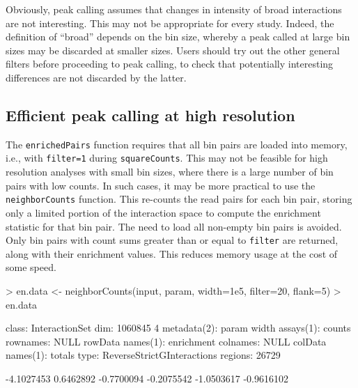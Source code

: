 \documentclass[12pt]{report}
\renewenvironment{Schunk}{\vspace{0pt}}{\vspace{0pt}}
\newcommand{\code}[1]{{\small\texttt{#1}}}
\begin{document}
Obviously, peak calling assumes that changes in intensity of broad interactions are not interesting.
This may not be appropriate for every study.
Indeed, the definition of ``broad'' depends on the bin size, whereby a peak called at large bin sizes may be discarded at smaller sizes.
Users should try out the other general filters before proceeding to peak calling, to check that potentially interesting differences are not discarded by the latter.

\subsection{Efficient peak calling at high resolution}
The \code{enrichedPairs} function requires that all bin pairs are loaded into memory, i.e., with \code{filter=1} during \code{squareCounts}.
This may not be feasible for high resolution analyses with small bin sizes, where there is a large number of bin pairs with low counts.
In such cases, it may be more practical to use the \code{neighborCounts} function.
This re-counts the read pairs for each bin pair, storing only a limited portion of the interaction space to compute the enrichment statistic for that bin pair.
The need to load all non-empty bin pairs is avoided.
Only bin pairs with count sums greater than or equal to \code{filter} are returned, along with their enrichment values.
This reduces memory usage at the cost of some speed.

\begin{Schunk}
\begin{Sinput}
> en.data <- neighborCounts(input, param, width=1e5, filter=20, flank=5)
> en.data
\end{Sinput}
\begin{Soutput}
class: InteractionSet 
dim: 1060845 4 
metadata(2): param width
assays(1): counts
rownames: NULL
rowData names(1): enrichment
colnames: NULL
colData names(1): totals
type: ReverseStrictGInteractions
regions: 26729
\end{Soutput}
\begin{Soutput}
[1] -4.1027453  0.6462892 -0.7700094 -0.2075542 -1.0503617 -0.9616102
\end{Soutput}
\end{Schunk}
\end{document}

